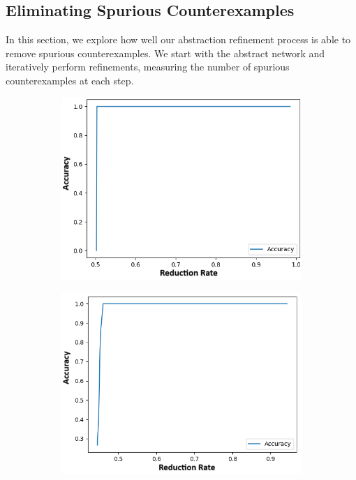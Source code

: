 \subsection{Eliminating Spurious Counterexamples}
\label{s:exp-mnist-rob}

In this section, we explore how well our abstraction refinement process is able
to remove spurious counterexamples. We start with the abstract network and
iteratively perform refinements, measuring the number of spurious
counterexamples at each step. 

\begin{figure}
    \vspace{-0.75cm}
    \begin{subfigure}{0.475\linewidth}
        \includegraphics[scale=0.4]{figs/mnist_2_256_prop_0_0.03_samples.png}
        \caption{}
        \label{f:mnist-prop-samples}
    \end{subfigure}
    \begin{subfigure}{0.475\linewidth}
        \includegraphics[scale=0.4]{figs/acas_ncex_5_8_3_samples.png}
        \caption{}
        \label{f:acas-ncex-samples}
    \end{subfigure}


\end{figure}
